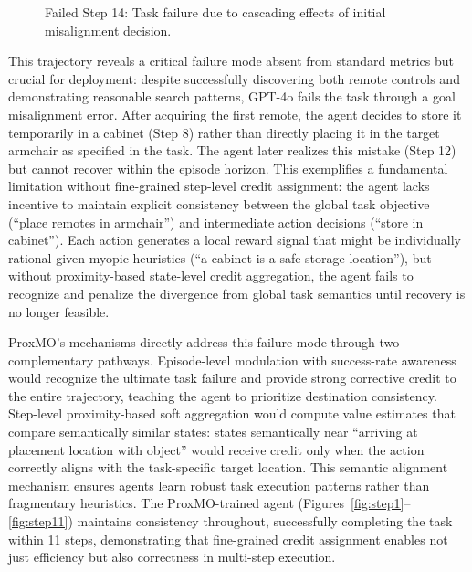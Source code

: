 \documentclass[11pt]{article}
\begin{document}
\begin{figure}[h]
\centering
{}
\caption{Failed Step 14: Task failure due to cascading effects of initial misalignment decision.}
\label{fig:failed_step14}
\end{figure}

\medskip

This trajectory reveals a critical failure mode absent from standard metrics but crucial for deployment: despite successfully discovering both remote controls and demonstrating reasonable search patterns, GPT-4o fails the task through a goal misalignment error. After acquiring the first remote, the agent decides to store it temporarily in a cabinet (Step 8) rather than directly placing it in the target armchair as specified in the task. The agent later realizes this mistake (Step 12) but cannot recover within the episode horizon. This exemplifies a fundamental limitation without fine-grained step-level credit assignment: the agent lacks incentive to maintain explicit consistency between the global task objective (``place remotes in armchair'') and intermediate action decisions (``store in cabinet''). Each action generates a local reward signal that might be individually rational given myopic heuristics (``a cabinet is a safe storage location''), but without proximity-based state-level credit aggregation, the agent fails to recognize and penalize the divergence from global task semantics until recovery is no longer feasible.

ProxMO's mechanisms directly address this failure mode through two complementary pathways. Episode-level modulation with success-rate awareness would recognize the ultimate task failure and provide strong corrective credit to the entire trajectory, teaching the agent to prioritize destination consistency. Step-level proximity-based soft aggregation would compute value estimates that compare semantically similar states: states semantically near ``arriving at placement location with object'' would receive credit only when the action correctly aligns with the task-specific target location. This semantic alignment mechanism ensures agents learn robust task execution patterns rather than fragmentary heuristics. The ProxMO-trained agent (Figures~\ref{fig:step1}--\ref{fig:step11}) maintains consistency throughout, successfully completing the task within 11 steps, demonstrating that fine-grained credit assignment enables not just efficiency but also correctness in multi-step execution.
\end{document}
